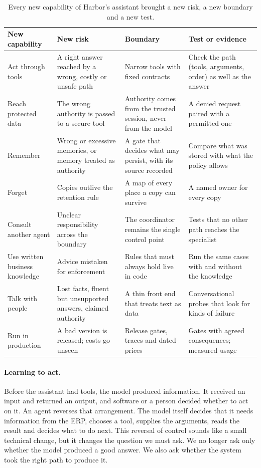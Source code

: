 \begin{table}[htbp]
\centering
\small
\caption{Every new capability of Harbor's assistant brought a new risk, a new boundary and a new test.}
\label{tab:journey}
\begin{tabularx}{\textwidth}{@{}>{\raggedright\arraybackslash}p{2.5cm}>{\raggedright\arraybackslash}X>{\raggedright\arraybackslash}X>{\raggedright\arraybackslash}X@{}}
\toprule
New capability & New risk & Boundary & Test or evidence \\
\midrule
Act through tools & A right answer reached by a wrong, costly or unsafe path & Narrow tools with fixed contracts & Check the path (tools, arguments, order) as well as the answer \\
Reach protected data & The wrong authority is passed to a secure tool & Authority comes from the trusted session, never from the model & A denied request paired with a permitted one \\
Remember & Wrong or excessive memories, or memory treated as authority & A gate that decides what may persist, with its source recorded & Compare what was stored with what the policy allows \\
Forget & Copies outlive the retention rule & A map of every place a copy can survive & A named owner for every copy \\
Consult another agent & Unclear responsibility across the boundary & The coordinator remains the single control point & Tests that no other path reaches the specialist \\
Use written business knowledge & Advice mistaken for enforcement & Rules that must always hold live in code & Run the same cases with and without the knowledge \\
Talk with people & Lost facts, fluent but unsupported answers, claimed authority & A thin front end that treats text as data & Conversational probes that look for kinds of failure \\
Run in production & A bad version is released; costs go unseen & Release gates, traces and dated prices & Gates with agreed consequences; measured usage \\
\bottomrule
\end{tabularx}
\end{table}

\paragraph{Learning to act.} Before the assistant had tools, the model produced information. It received an input and returned an output, and software or a person decided whether to act on it. An agent reverses that arrangement. The model itself decides that it needs information from the ERP, chooses a tool, supplies the arguments, reads the result and decides what to do next. This reversal of control sounds like a small technical change, but it changes the question we must ask. We no longer ask only whether the model produced a good answer. We also ask whether the system took the right path to produce it.

